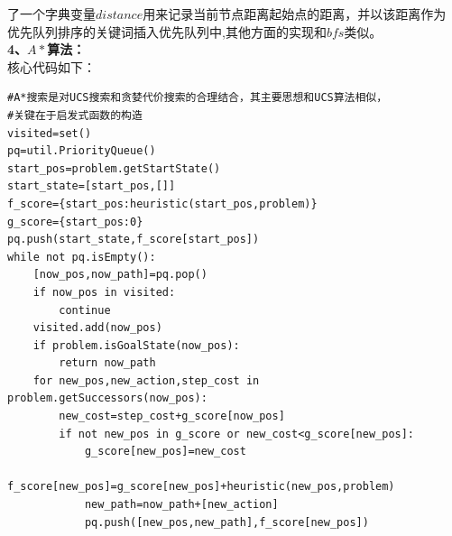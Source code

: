 \documentclass[a4paper,12pt,UTF8]{article}
\begin{document}
\begin{flushleft}
{{        了一个字典变量$distance$用来记录当前节点距离起始点的距离，并以该距离作为
        优先队列排序的关键词插入优先队列中,其他方面的实现和$bfs$类似。\\
    }
    \large{
        \hspace{1cm}\textbf{4、$A*$算法：\\}
    }
    \normalsize{
        \hspace{1cm}核心代码如下：\\
    }
    \scriptsize{
        \begin{lstlisting}
#A*搜索是对UCS搜索和贪婪代价搜索的合理结合，其主要思想和UCS算法相似，
#关键在于启发式函数的构造
visited=set()
pq=util.PriorityQueue()
start_pos=problem.getStartState()
start_state=[start_pos,[]]
f_score={start_pos:heuristic(start_pos,problem)}
g_score={start_pos:0}
pq.push(start_state,f_score[start_pos])
while not pq.isEmpty():
    [now_pos,now_path]=pq.pop()
    if now_pos in visited:
        continue
    visited.add(now_pos)
    if problem.isGoalState(now_pos):
        return now_path
    for new_pos,new_action,step_cost in problem.getSuccessors(now_pos):
        new_cost=step_cost+g_score[now_pos]
        if not new_pos in g_score or new_cost<g_score[new_pos]:
            g_score[new_pos]=new_cost
            f_score[new_pos]=g_score[new_pos]+heuristic(new_pos,problem)
            new_path=now_path+[new_action]
            pq.push([new_pos,new_path],f_score[new_pos])


\end{lstlisting}}}
\end{flushleft}
\end{document}

